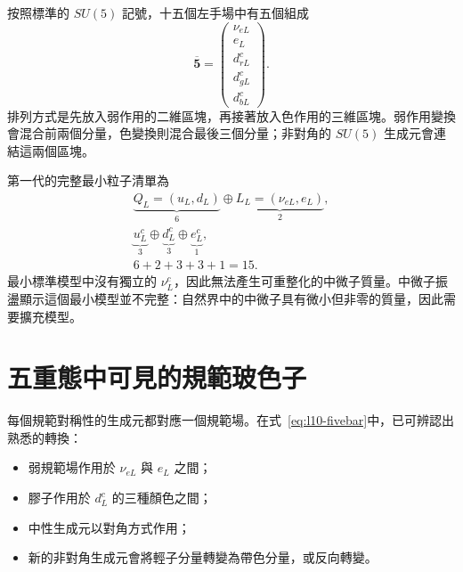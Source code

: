 按照標準的 \(SU(5)\) 記號，十五個左手場中有五個組成
\begin{equation}
\overline{\mathbf5}
=
\begin{pmatrix}
\nu_{eL}\\
e_L\\
d^c_{rL}\\
d^c_{gL}\\
d^c_{bL}
\end{pmatrix}.
\label{eq:l10-fivebar}
\end{equation}
排列方式是先放入弱作用的二維區塊，再接著放入色作用的三維區塊。弱作用變換會混合前兩個分量，色變換則混合最後三個分量；非對角的 \(SU(5)\) 生成元會連結這兩個區塊。


第一代的完整最小粒子清單為
\begin{equation}
\begin{gathered}
\underbrace{Q_L=(u_L,d_L)}_{6}
\oplus
\underbrace{L_L=(\nu_{eL},e_L)}_{2},\\
\underbrace{u^c_L}_{3}
\oplus
\underbrace{d^c_L}_{3}
\oplus
\underbrace{e^c_L}_{1},\\
6+2+3+3+1=15.
\end{gathered}
\label{eq:l10-fifteen}
\end{equation}
最小標準模型中沒有獨立的 \(\nu^c_L\)，因此無法產生可重整化的中微子質量。中微子振盪顯示這個最小模型並不完整：自然界中的中微子具有微小但非零的質量，因此需要擴充模型。

\begin{classroomqa}
\end{classroomqa}

\section{五重態中可見的規範玻色子}

每個規範對稱性的生成元都對應一個規範場。在式~\eqref{eq:l10-fivebar}中，已可辨認出熟悉的轉換：
\begin{itemize}
\item 弱規範場作用於 \(\nu_{eL}\) 與 \(e_L\) 之間；
\item 膠子作用於 \(d^c_L\) 的三種顏色之間；
\item 中性生成元以對角方式作用；
\item 新的非對角生成元會將輕子分量轉變為帶色分量，或反向轉變。
\end{itemize}

